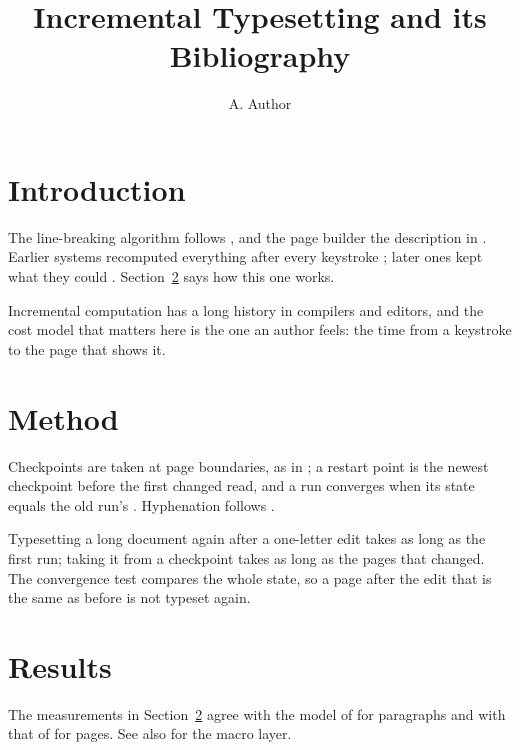 \documentclass{article}
\title{Incremental Typesetting and its Bibliography}
\author{A. Author}
\begin{document}
\maketitle

\section{Introduction}\label{sec:intro}
The line-breaking algorithm follows \citet{knuth81}, and the page builder
the description in \citet{knuth84}. Earlier systems recomputed everything
after every keystroke \citep{lamport94}; later ones kept what they could
\citep{acar05,hammer14}. Section~\ref{sec:method} says how this one works.

Incremental computation has a long history in compilers and editors, and
the cost model that matters here is the one an author feels: the time from
a keystroke to the page that shows it.

\section{Method}\label{sec:method}
Checkpoints are taken at page boundaries, as in \citet{acar05}; a restart
point is the newest checkpoint before the first changed read, and a run
converges when its state equals the old run's \citep[ch.~3]{hammer14}.
Hyphenation follows \citet{liang83}.

Typesetting a long document again after a one-letter edit takes as long as
the first run; taking it from a checkpoint takes as long as the pages that
changed. The convergence test compares the whole state, so a page after the
edit that is the same as before is not typeset again.

\section{Results}\label{sec:results}
The measurements in Section~\ref{sec:method} agree with the model of
\citet{knuth84} for paragraphs and with that of \citet{plass81} for pages.
See also \citet{lamport94} for the macro layer.



\end{document}
